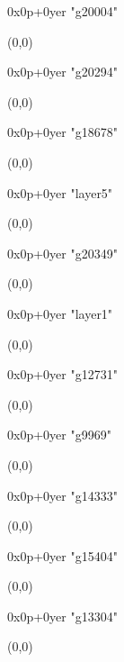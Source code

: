    0x0p+0yer "g20004"
  \begin{textblock}{1}(0,0)
  \end{textblock}

   0x0p+0yer "g20294"
  \begin{textblock}{1}(0,0)
  \end{textblock}

   0x0p+0yer "g18678"
  \begin{textblock}{1}(0,0)
  \end{textblock}

   0x0p+0yer "layer5"
  \begin{textblock}{1}(0,0)
  \end{textblock}

   0x0p+0yer "g20349"
  \begin{textblock}{1}(0,0)
  \end{textblock}

   0x0p+0yer "layer1"
  \begin{textblock}{1}(0,0)
  \end{textblock}

   0x0p+0yer "g12731"
  \begin{textblock}{1}(0,0)
  \end{textblock}

   0x0p+0yer "g9969"
  \begin{textblock}{1}(0,0)
  \end{textblock}

   0x0p+0yer "g14333"
  \begin{textblock}{1}(0,0)
  \end{textblock}

   0x0p+0yer "g15404"
  \begin{textblock}{1}(0,0)
  \end{textblock}

   0x0p+0yer "g13304"
  \begin{textblock}{1}(0,0)
  \end{textblock}
